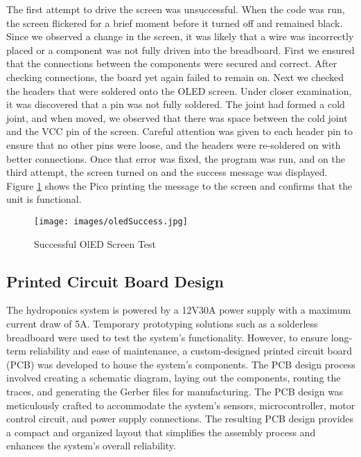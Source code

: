 \documentclass[12pt]{article} %
\begin{document}
\pagebreak
\noindent The first attempt to drive the screen was unsuccessful. When the code was run, the screen flickered for a brief moment before it turned off and remained black. Since we observed a change in the screen, it was likely that a wire was incorrectly placed or a component was not fully driven into the breadboard. First we ensured that the connections between the components were secured and correct. After checking connections, the board yet again failed to remain on. Next we checked the headers that were soldered onto the OLED screen. Under closer examination, it was discovered that a pin was not fully soldered. The joint had formed a cold joint, and when moved, we observed that there was space between the cold joint and the VCC pin of the screen. Careful attention was given to each header pin to ensure that no other pins were loose, and the headers were re-soldered on with better connections. Once that error was fixed, the program was run, and on the third attempt, the screen turned on and the success message was displayed. Figure \ref{fig:OLED Success} shows the Pico printing the message to the screen and confirms that the unit is functional. 

\begin{figure}[H]
  \centering
  \texttt{[image: images/oledSuccess.jpg]}
  \caption{Successful OlED Screen Test}
  \label{fig:OLED Success}
\end{figure}

\subsection{Printed Circuit Board Design}
\noindent The hydroponics system is powered by a 12V30A power supply with a maximum current draw of 5A. Temporary prototyping solutions such as a solderless breadboard were used to test the system's functionality. However, to ensure long-term reliability and ease of maintenance, a custom-designed printed circuit board (PCB) was developed to house the system's components. The PCB design process involved creating a schematic diagram, laying out the components, routing the traces, and generating the Gerber files for manufacturing. The PCB design was meticulously crafted to accommodate the system's sensors, microcontroller, motor control circuit, and power supply connections. The resulting PCB design provides a compact and organized layout that simplifies the assembly process and enhances the system's overall reliability.
\newline
\newline
\end{document}
